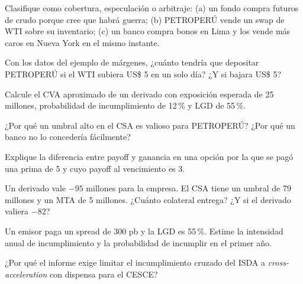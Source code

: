 \ejercicio[conceptual] Clasifique como cobertura, especulación o arbitraje: (a) un fondo compra futuros de crudo porque cree que habrá guerra; (b) PETROPERÚ vende un swap de WTI sobre su inventario; (c) un banco compra bonos en Lima y los vende más caros en Nueva York en el mismo instante.

\ejercicio[cálculo] Con los datos del ejemplo de márgenes, ¿cuánto tendría que depositar PETROPERÚ si el WTI subiera US\$ 5 en un solo día? ¿Y si bajara US\$ 5?

\ejercicio[cálculo] Calcule el CVA aproximado de un derivado con exposición esperada de 25 millones, probabilidad de incumplimiento de 12\,\% y LGD de 55\,\%.

\ejercicio[conceptual] ¿Por qué un umbral alto en el CSA es valioso para PETROPERÚ? ¿Por qué un banco no lo concedería fácilmente?

\ejercicio[conceptual] Explique la diferencia entre payoff y ganancia en una opción por la que se pagó una prima de 5 y cuyo payoff al vencimiento es 3.

\ejercicio[cálculo] Un derivado vale $-95$ millones para la empresa. El CSA tiene un umbral de 79 millones y un MTA de 5 millones. ¿Cuánto colateral entrega? ¿Y si el derivado valiera $-82$?

\ejercicio[cálculo] Un emisor paga un spread de 300 pb y la LGD es 55\,\%. Estime la intensidad anual de incumplimiento y la probabilidad de incumplir en el primer año.

\ejercicio[conceptual] ¿Por qué el informe exige limitar el incumplimiento cruzado del ISDA a \emph{cross-acceleration} con dispensa para el CESCE?
